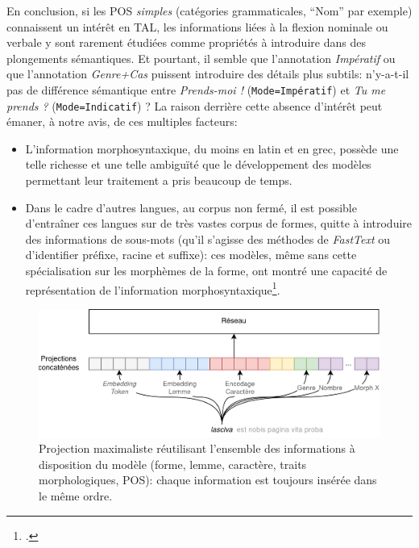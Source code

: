 En conclusion, si les POS \textit{simples} (catégories grammaticales, \enquote{Nom} par exemple) connaissent un intérêt en TAL, les informations liées à la flexion nominale ou verbale y sont rarement étudiées comme propriétés à introduire dans des plongements sémantiques. Et pourtant, il semble que l'annotation \textit{Impératif} ou que l'annotation \textit{Genre+Cas} puissent introduire des détails plus subtils: n'y-a-t-il pas de différence sémantique entre \textit{Prends-moi !} (\texttt{Mode=Impératif}) et \textit{Tu me prends ?} (\texttt{Mode=Indicatif}) ? La raison derrière cette absence d'intérêt peut émaner, à notre avis, de ces multiples facteurs:
\begin{itemize}
    \item L'information morphosyntaxique, du moins en latin et en grec, possède une telle richesse et une telle ambiguïté que le développement des modèles permettant leur traitement a pris beaucoup de temps.
    \item Dans le cadre d'autres langues, au corpus non fermé, il est possible d'entraîner ces langues sur de très vastes corpus de formes, quitte à introduire des informations de sous-mots (qu'il s'agisse des méthodes de \textit{FastText} ou d'identifier préfixe, racine et suffixe): ces modèles, même sans cette spécialisation sur les morphèmes de la forme, ont montré une capacité de représentation de l'information morphosyntaxique\footcite{qian_investigating_2016}.%
    
\end{itemize}


\begin{figure}
    \centering
    \includegraphics[width=\linewidth]{figures/chap4/Projection.drawio.png}
    \caption{Projection maximaliste réutilisant l'ensemble des informations à disposition du modèle (forme, lemme, caractère, traits morphologiques, POS): chaque information est toujours insérée dans le même ordre.}
    \label{fig:chap4:projection:morphosyntax}
\end{figure}

